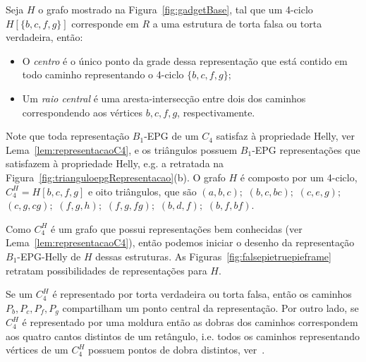 
\begin{definition}
Seja $H$ o grafo mostrado na  Figura~\ref{fig:gadgetBase}, tal que um 4-ciclo $H[\{b, c, f, g \}]$ corresponde em $R$ a uma estrutura de torta falsa ou torta verdadeira, então:

\begin{itemize}
\item O \emph{centro} é o único ponto da grade dessa representação que está contido em todo caminho representando o 4-ciclo $ \{b, c, f, g \}$; \label{lab:lab1}

\item Um \emph {raio central} é uma aresta-intersecção entre dois dos caminhos correspondendo aos vértices $ b, c, f, g$, respectivamente.
\end{itemize}
\end{definition}


Note que toda representação $B_1$-EPG de um $C_4$ satisfaz à propriedade Helly, ver Lema~\ref{lem:representacaoC4}, e os triângulos possuem $B_1$-EPG representações que satisfazem à propriedade Helly, e.g. a retratada na Figura~\ref{fig:trianguloepgRepresentacao}(b). O grafo $H$ é composto por um 4-ciclo,  $C_4^{H}=H[b, c, f, g]$ e oito triângulos, que são $(a,b,c);$ $(b,c,bc);$ $(c,e,g);$ $(c,g,cg);$ $(f,g,h);$ $(f,g,fg);$ $(b,d,f);$ $(b,f,bf).$

Como $C_4^{H}$ é um grafo que possui representações bem conhecidas (ver Lema~\ref{lem:representacaoC4}), então podemos iniciar o desenho da representação $B_{1}$-EPG-Helly de $H$ dessas estruturas. As  Figuras~\ref{fig:falsepietruepieframe} retratam possibilidades de representações para $H$.

Se um $C_4^{H}$ é representado por torta verdadeira ou torta falsa, então os caminhos $P_b, P_c, P_f, P_g$ compartilham um ponto central da representação. Por outro lado, se  $C_4^{H}$ é representado por uma moldura então as dobras dos caminhos correspondem aos quatro cantos distintos de um retângulo, i.e. todos os caminhos representando  vértices de um $C_4^{H}$ possuem pontos de dobra distintos, ver~\cite{golumbic2009}.

